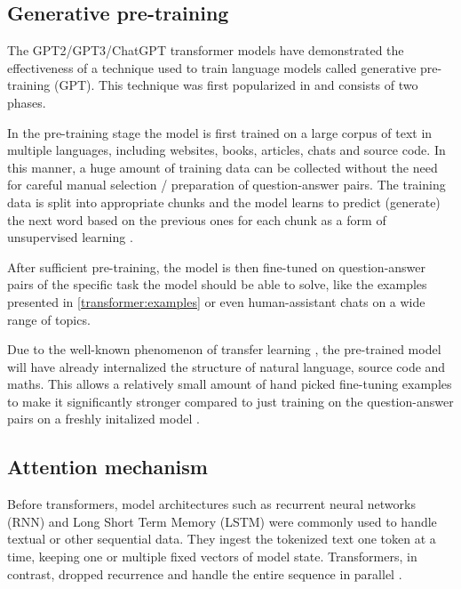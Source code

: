\subsection{Generative pre-training}

The GPT2/GPT3/ChatGPT transformer models have demonstrated the effectiveness of a technique used to train language models called generative pre-training (GPT). This technique was first popularized in \cite{improvinglu} and consists of two phases.

In the pre-training stage the model is first trained on a large corpus of text in multiple languages, including websites, books, articles, chats and source code. In this manner, a huge amount of training data can be collected without the need for careful manual selection / preparation of question-answer pairs. The training data is split into appropriate chunks and the model learns to predict (generate) the next word based on the previous ones for each chunk as a form of unsupervised learning .

After sufficient pre-training, the model is then fine-tuned on question-answer pairs of the specific task the model should be able to solve, like the examples presented in \cref{transformer:examples} or even human-assistant chats on a wide range of topics.

Due to the well-known phenomenon of transfer learning \cite{transferlearning}, the pre-trained model will have already internalized the structure of natural language, source code and maths. 
This allows a relatively small amount of hand picked fine-tuning examples to make it significantly stronger compared to just training on the question-answer pairs on a freshly initalized model .

\subsection{Attention mechanism}
\label{transformer:attn}

Before transformers, model architectures such as recurrent neural networks (RNN) and Long Short Term Memory (LSTM) were commonly used to handle textual or other sequential data. They ingest the tokenized text one token at a time, keeping one or multiple fixed vectors of model state. Transformers, in contrast, dropped recurrence and handle the entire sequence in parallel .

